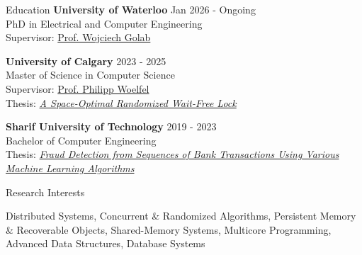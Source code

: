 \documentclass{resume} %
\begin{document}

\begin{rSection}{Education}
{\bf University of Waterloo} \hfill {Jan 2026 - Ongoing} 
\\ PhD in Electrical and Computer Engineering
\\ Supervisor: \href{https://uwaterloo.ca/distributed-algorithms-systems-lab/}{Prof. Wojciech Golab}

{\bf University of Calgary} \hfill { 2023 - 2025} 
\\ Master of Science in Computer Science
\\ Supervisor: \href{https://www.woelfellab.org/about.html}{Prof. Philipp Woelfel}
\\ Thesis: \textit{\href{https://ucalgary.scholaris.ca/bitstreams/5ae5cf8f-5009-4db3-b91e-d3dbb679b5bf/download}{A Space-Optimal Randomized Wait-Free Lock}}


{\bf Sharif University of Technology} \hfill { 2019 - 2023} 
\\ Bachelor of Computer Engineering
\\ Thesis: \href{https://github.com/kahbodaeini/Fraud-Detection}{\textit{Fraud Detection from Sequences of Bank Transactions Using Various Machine Learning Algorithms}}


\end{rSection}


\begin{rSection}{Research Interests}

Distributed Systems, Concurrent \& Randomized Algorithms, Persistent Memory \& Recoverable Objects,
Shared-Memory Systems, Multicore Programming, Advanced Data Structures, Database Systems
\end{rSection}
\end{document}
